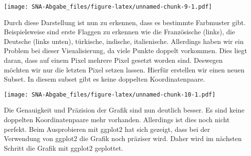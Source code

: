 \documentclass[
]{article}
\newenvironment{Shaded}{\begin{snugshade}}{\end{snugshade}}
\newcommand{\AttributeTok}[1]{\textcolor[rgb]{0.13,0.29,0.53}{#1}}
\newcommand{\CommentTok}[1]{\textcolor[rgb]{0.56,0.35,0.01}{\textit{#1}}}
\newcommand{\ConstantTok}[1]{\textcolor[rgb]{0.56,0.35,0.01}{#1}}
\newcommand{\DecValTok}[1]{\textcolor[rgb]{0.00,0.00,0.81}{#1}}
\newcommand{\FunctionTok}[1]{\textcolor[rgb]{0.13,0.29,0.53}{\textbf{#1}}}
\newcommand{\NormalTok}[1]{#1}
\newcommand{\OtherTok}[1]{\textcolor[rgb]{0.56,0.35,0.01}{#1}}
\newcommand{\SpecialCharTok}[1]{\textcolor[rgb]{0.81,0.36,0.00}{\textbf{#1}}}
\newcommand{\StringTok}[1]{\textcolor[rgb]{0.31,0.60,0.02}{#1}}
\begin{document}
\texttt{[image: SNA-Abgabe\_files/figure-latex/unnamed-chunk-9-1.pdf]}

Durch diese Darstellung ist nun zu erkennen, dass es bestimmte
Farbmuster gibt. Beispielsweise sind erste Flaggen zu erkennen wie die
Französische (links), die Deutsche (links unten), türkische, indische,
italienische. Allerdings haben wir ein Problem bei dieser
Visualisierung, da viele Punkte doppelt vorkommen. Dies liegt daran,
dass auf einem Pixel mehrere Pixel gesetzt worden sind. Deswegen möchten
wir nur die letzten Pixel setzen lassen. Hierfür erstellen wir einen
neuen Subset. In diesem subset gibt es keine doppelten Koordinatenpaare.

\begin{Shaded}
\end{Shaded}

\texttt{[image: SNA-Abgabe\_files/figure-latex/unnamed-chunk-10-1.pdf]}

Die Genauigkeit und Präzision der Grafik sind nun deutlich besser. Es
sind keine doppelten Koordinatenpaare mehr vorhanden. Allerdings ist
dies noch nicht perfekt. Beim Ausprobieren mit ggplot2 hat sich gezeigt,
dass bei der Verwendung von ggplot2 die Grafik noch präziser wird. Daher
wird im nächsten Schritt die Grafik mit ggplot2 geplottet.
\end{document}
